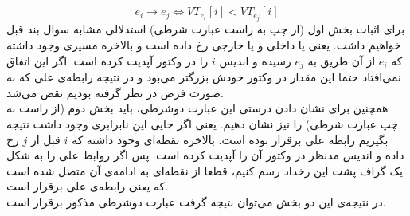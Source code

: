 \documentclass{article}
\begin{document}
\begin{multicols}{2}
\subsection{}
$$e_i \rightarrow e_j \Leftrightarrow VT_{e_i}[i] < VT_{e_j}[i]$$
برای اثبات بخش اول (از چپ به راست عبارت شرطی) استدلالی مشابه سوال بند قبل خواهیم داشت. یعنی یا
داخلی و یا خارجی رخ داده است و بالاخره مسیری وجود داشته که 
$e_i$
از آن طریق به
$e_j$
رسیده و اندیس
$i$
را در وکتور آپدیت کرده است. اگر این اتفاق نمی‌افتاد حتما این مقدار در وکتور خودش بزرگتر می‌بود و در نتیجه رابطه‌ی علی که به صورت فرض در نظر گرفته بودیم نقض می‌شد.\\
همچنین برای نشان دادن درستی این عبارت دوشرطی، باید بخش دوم (از راست به چپ عبارت شرطی) را نیز نشان دهیم. یعنی اگر جایی این نابرابری وجود داشت نتیجه بگیریم رابطه علی برقرار بوده است. بالاخره نقطه‌ای وجود داشته که
$i$
قبل از
$j$
رخ داده و اندیس مدنظر در وکتور آن را آپدیت کرده است. پس اگر روابط علی را به شکل یک گراف پشت این رخداد رسم کنیم، قطعا از نقطه‌ای به ادامه‌ی آن متصل شده است که یعنی رابطه‌ی علی برقرار است.\\
در نتیجه‌ی این دو بخش می‌توان نتیجه گرفت عبارت دوشرطی مذکور برقرار است.


\end{multicols}
\end{document}
